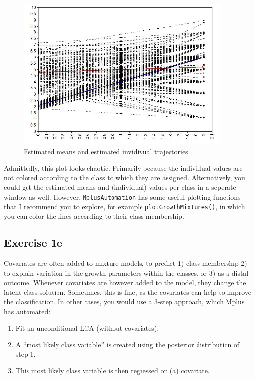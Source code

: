\documentclass[
]{book}
\providecommand{\tightlist}{%
  \setlength{\itemsep}{0pt}\setlength{\parskip}{0pt}}
\begin{document}
\begin{figure}
\centering
\includegraphics[width=4.16667in,height=\textheight]{./figures/exercise1D-estimatedMeansAndValues.jpg}
\caption{Estimated means and estimated invidivual trajectories}
\end{figure}

Admittedly, this plot looks chaotic. Primarily because the individual values are not colored according to the class to which they are assigned. Alternatively, you could get the estimated means and (individual) values per class in a seperate window as well. However, \texttt{MplusAutomation} has some useful plotting functions that I recommend you to explore, for example \texttt{plotGrowthMixtures()}, in which you can color the lines according to their class membership.

\hypertarget{exercise-1e}{%
\subsection{Exercise 1e}\label{exercise-1e}}

Covariates are often added to mixture models, to predict 1) class membership 2) to explain variation in the growth parameters within the classes, or 3) as a distal outcome. Whenever covariates are however added to the model, they change the latent class solution. Sometimes, this is fine, as the covariates can help to improve the classification. In other cases, you would use a 3-step approach, which Mplus has automated:

\begin{enumerate}
\def\labelenumi{\arabic{enumi}.}
\tightlist
\item
  Fit an unconditional LCA (without covariates).
\item
  A ``most likely class variable'' is created using the posterior distribution of step 1.
\item
  This most likely class variable is then regressed on (a) covariate.
\end{enumerate}
\end{document}
